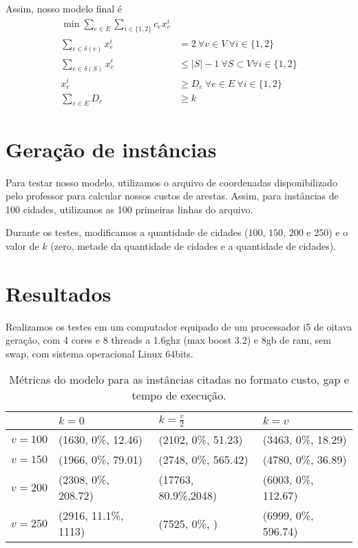 \documentclass[11pt]{article}
\theoremstyle{definition}
\theoremstyle{definition}
\theoremstyle{remark}
\theoremstyle{remark}
\theoremstyle{remark}
\theoremstyle{remark}
\theoremstyle{definition}
\begin{document}
Assim, nosso modelo final é
\begin{align*}
\min \sum \limits_{e \in E} \sum \limits_{i \in \{1,2\}} c_{e} x_{e}^{i}& \\
\sum \limits_{e \in \delta(v)} x_{e}^{i} &= 2 \ \forall v \in V \ \forall i \in \{1,2\} \\
\sum \limits_{e \in \delta(S)} x_{e}^{i} &\leq |S| -1 \ \forall S \subset V \forall i \in \{1,2\} \\
x_{e}^{i} &\geq D_{e} \ \forall e \in E \ \forall i \in \{1,2\} \\
\sum \limits_{e \in E} D_{e} &\geq k
\end{align*}

\section*{Geração de instâncias}
\label{sec:org682535d}
Para testar nosso modelo, utilizamos o arquivo de coordenadas disponibilizado pelo professor para calcular nossos custos de arestas. Assim, para instâncias de 100 cidades, utilizamos as 100 primeiras linhas do arquivo.

Durante os testes, modificamos a quantidade de cidades (\(100\), \(150\), \(200\) e \(250\)) e o valor de \(k\) (zero, metade da quantidade de cidades e a quantidade de cidades).
\section*{Resultados}
\label{sec:org130df22}

Realizamos os testes em um computador equipado de um processador i5 de oitava geração, com 4 cores e 8 threads a 1.6ghz (max boost 3.2) e 8gb de ram, sem swap, com sistema operacional Linux 64bits. 


\begin{table}[htbp]
\caption{Métricas do modelo para as instâncias citadas no formato custo, gap e tempo de execução.}
\centering
\begin{tabular}{llll}
 & \(k=0\) & \(k=\frac{v}{2}\) & \(k = v\)\\
\hline
\(v = 100\) & (1630, 0\%, 12.46) & (2102, 0\%, 51.23) & (3463, 0\%, 18.29)\\
\(v = 150\) & (1966, 0\%, 79.01) & (2748, 0\%, 565.42) & (4780, 0\%, 36.89)\\
\(v = 200\) & (2308, 0\%, 208.72) & (17763, 80.9\%,2048) & (6003, 0\%, 112.67)\\
\(v = 250\) & (2916, 11.1\%, 1113) & (7525, 0\%, ) & (6999, 0\%, 596.74)\\
\end{tabular}
\end{table}
\end{document}
